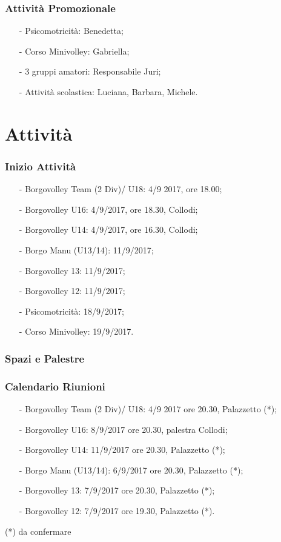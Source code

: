 \documentclass{beamer}
\begin{document}
\begin{frame}
\frametitle{Attività Promozionale}
\begin{itemize}
\item[-]Psicomotricità: Benedetta;
\item[-]Corso Minivolley: Gabriella;
\item[-]3 gruppi amatori: Responsabile Juri;
\item[-]Attività scolastica: Luciana, Barbara, Michele.
\end{itemize}
\end{frame}

\section{Attività}


\begin{frame}
\frametitle{Inizio Attività}
\begin{itemize}
\item[-]Borgovolley Team (2 Div)/ U18: 4/9 2017, ore 18.00;
\item[-]Borgovolley U16: 4/9/2017, ore 18.30, Collodi;
\item[-]Borgovolley U14: 4/9/2017, ore 16.30, Collodi;
\item[-]Borgo Manu (U13/14): 11/9/2017;
\item[-]Borgovolley 13: 11/9/2017;
\item[-]Borgovolley 12: 11/9/2017;
\item[-]Psicomotricità: 18/9/2017;
\item[-]Corso Minivolley: 19/9/2017.
\end{itemize}
\end{frame}


\begin{frame}
\frametitle{Spazi e Palestre}
\end{frame}


\begin{frame}
\frametitle{Calendario Riunioni}
\begin{itemize}
\item[-]Borgovolley Team (2 Div)/ U18: 4/9 2017 ore 20.30, Palazzetto (*);
\item[-]Borgovolley U16: 8/9/2017 ore 20.30, palestra Collodi;
\item[-]Borgovolley U14: 11/9/2017 ore 20.30, Palazzetto (*);
\item[-]Borgo Manu (U13/14): 6/9/2017 ore 20.30, Palazzetto (*);
\item[-]Borgovolley 13: 7/9/2017 ore 20.30,  Palazzetto (*);
\item[-]Borgovolley 12: 7/9/2017 ore 19.30, Palazzetto (*).
\end{itemize}

(*) da confermare
\end{frame}
\end{document}
